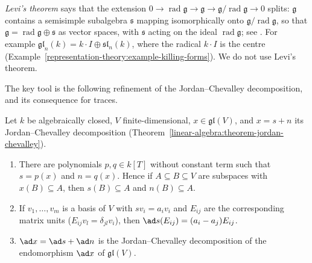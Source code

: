 \begin{remark}\label{representation-theory:remark-levi}
\emph{Levi's theorem} says that the extension $0 \to \operatorname{rad}\mathfrak{g} \to \mathfrak{g} \to \mathfrak{g}/\operatorname{rad}\mathfrak{g} \to 0$ splits: $\mathfrak{g}$
contains a semisimple subalgebra $\mathfrak{s}$ mapping isomorphically onto $\mathfrak{g}/\operatorname{rad}\mathfrak{g}$, so that $\mathfrak{g} = \operatorname{rad}\mathfrak{g}
\oplus \mathfrak{s}$ as vector spaces, with $\mathfrak{s}$ acting on the ideal $\operatorname{rad}\mathfrak{g}$; see \cite[Appendix E]{fulton-harris}. For example
$\mathfrak{gl}_n(k) = k\cdot I \oplus \mathfrak{sl}_n(k)$, where the radical $k \cdot I$ is the centre (Example~\ref{representation-theory:example-killing-forms}). We do not use
Levi's theorem.
\end{remark}

The key tool is the following refinement of the Jordan--Chevalley decomposition, and its consequence for traces.

\begin{lemma}\label{representation-theory:lemma-jordan-ad}
Let $k$ be algebraically closed, $V$ finite-dimensional, $x \in \mathfrak{gl}(V)$, and $x = s + n$ its Jordan--Chevalley decomposition
(Theorem~\ref{linear-algebra:theorem-jordan-chevalley}).
\begin{enumerate}
\item There are polynomials $p, q \in k[T]$ without constant term such that $s = p(x)$ and $n = q(x)$. Hence if $A \subseteq B \subseteq V$ are subspaces with
$x(B) \subseteq A$, then $s(B) \subseteq A$ and $n(B) \subseteq A$.
\item If $v_1, \ldots, v_m$ is a basis of $V$ with $sv_i = a_iv_i$ and $E_{ij}$ are the corresponding matrix units ($E_{ij}v_l = \delta_{jl}v_i$), then
$\ad s(E_{ij}) = (a_i - a_j)E_{ij}$.
\item $\ad x = \ad s + \ad n$ is the Jordan--Chevalley decomposition of the endomorphism $\ad x$ of $\mathfrak{gl}(V)$.
\end{enumerate}
\end{lemma}

